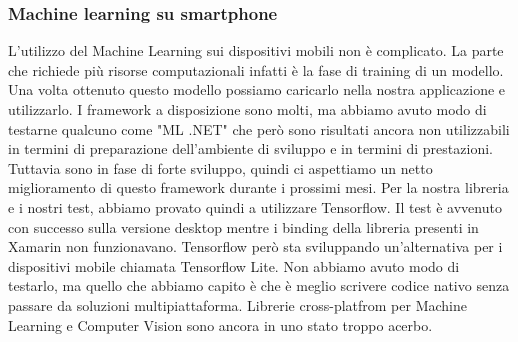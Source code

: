 \documentclass[twoside]{supsistudent}
\begin{document}
\subsubsection{Machine learning su smartphone}%
L'utilizzo del Machine Learning sui dispositivi mobili non è complicato. La parte che richiede più risorse computazionali infatti è la fase di training di un modello. Una volta ottenuto questo modello possiamo caricarlo nella nostra applicazione e utilizzarlo. I framework a disposizione sono molti, ma abbiamo avuto modo di testarne qualcuno come "ML .NET"\cite{mlNet} che però sono risultati ancora non utilizzabili in termini di preparazione dell'ambiente di sviluppo e in termini di prestazioni. Tuttavia sono in fase di forte sviluppo, quindi ci aspettiamo un netto miglioramento di questo framework durante i prossimi mesi. Per la nostra libreria e i nostri test, abbiamo provato quindi a utilizzare Tensorflow\cite{tensorFlow}. Il test è avvenuto con successo sulla versione desktop mentre i binding della libreria presenti in Xamarin non funzionavano. Tensorflow però sta sviluppando un'alternativa per i dispositivi mobile chiamata Tensorflow Lite. Non abbiamo avuto modo di testarlo, ma quello che abbiamo capito è che è meglio scrivere codice nativo senza passare da soluzioni multipiattaforma. Librerie cross-platfrom per Machine Learning e Computer Vision sono ancora in uno stato troppo acerbo. 
\end{document}
